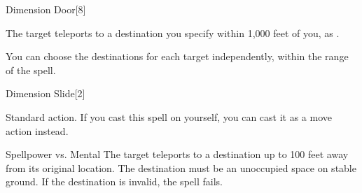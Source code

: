 \begin{spellsection}[Mass]{Dimension Door}[8]
    \begin{spellheader}
    \end{spellheader}
    \begin{spellcontent}
        \begin{spelltargetinginfo}
            \spellrng{\rngmed}
        \end{spelltargetinginfo}
        \begin{spelleffects}
            \spelleffect The target teleports to a destination you specify within 1,000 feet of you, as .
        \end{spelleffects}
    \end{spellcontent}
    \begin{spellfooter}
        \spellnotes You can choose the destinations for each target independently, within the range of the spell.
        \miscastexplode
    \end{spellfooter}
\end{spellsection}

\begin{spellsection}{Dimension Slide}[2]
    \begin{spellheader}
    \end{spellheader}
    \begin{spellcontent}
        \begin{spelltargetinginfo}
            \spelltime Standard action. If you cast this spell on yourself, you can cast it as a move action instead.
        \end{spelltargetinginfo}
        \begin{spelleffects}
            \begin{spellattack}{Spellpower vs. Mental}
                \spelleffect The target teleports to a destination up to 100 feet away from its original location. The destination must be an unoccupied space on stable ground. If the destination is invalid, the spell fails.
            \end{spellattack}
        \end{spelleffects}
    \end{spellcontent}
    \begin{spellfooter}
        \miscastrandom
    \end{spellfooter}
\end{spellsection}

